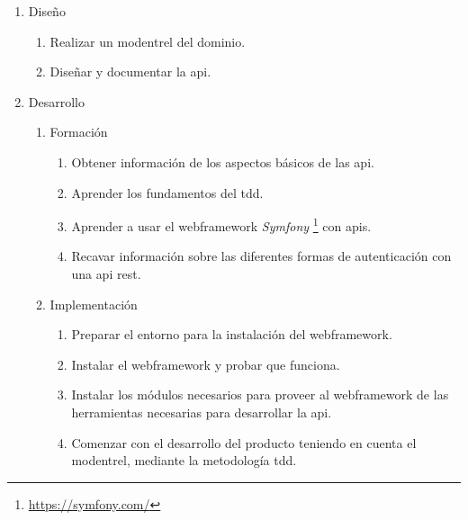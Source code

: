 \begin{enumerate}
\begin{enumerate}
  \end{enumerate}

  \item Diseño
  \label{item:diseno}

  \begin{enumerate}

    \item Realizar un \gls{modentrel} del dominio.
    \item Diseñar y documentar la \gls{api}. \label{item:disdocapi}

  \end{enumerate}

  \item Desarrollo

  \begin{enumerate}

    \item Formación

    \begin{enumerate}

      \item Obtener información de los aspectos básicos de las \gls{api}.
      \item Aprender los fundamentos del \gls{tdd}.
      \item Aprender a usar el \gls{webframework} \textit{Symfony}
        \footnote{\url{https://symfony.com/}} con \gls{api}s.
      \item Recavar información sobre las diferentes formas de autenticación
        con una \gls{api} \gls{rest}.

    \end{enumerate}
 
    \item Implementación

    \begin{enumerate}

      \item Preparar el entorno para la instalación del \gls{webframework}.
      \item Instalar el \gls{webframework} y probar que funciona.
      \item Instalar los módulos necesarios para proveer al \gls{webframework}
        de las herramientas necesarias para desarrollar la \gls{api}.
      \item Comenzar con el desarrollo del producto teniendo en cuenta el
        \gls{modentrel}, mediante la metodología \gls{tdd}.

    \end{enumerate}


  \end{enumerate}

\end{enumerate}

